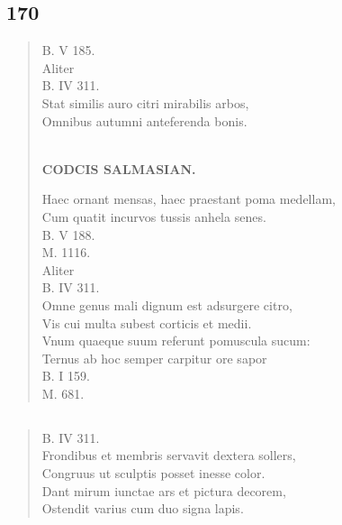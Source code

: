 \documentclass[11pt, a4paper]{report}
\begin{document}
            \subsection*{170}
      \begin{verse}
      B. V 185. \\ Aliter \\ B. IV 311. \\ Stat similis auro citri mirabilis arbos, \\ Omnibus autumni anteferenda bonis. \\ 
        ﻿\pagebreak 
    \begin{center} \textbf{CODCIS SALMASIAN.} \end{center} \marginpar{[151]} Haec ornant mensas, haec praestant poma medellam, \\ Cum quatit incurvos tussis anhela senes. \\ B. V 188. \\ M. 1116. \\ Aliter \\ B. IV 311. \\ Omne genus mali dignum est adsurgere citro, \\ Vis cui multa subest corticis et medii. \\ Vnum quaeque suum referunt pomuscula sucum: \\ Ternus ab hoc semper carpitur ore sapor \\ B. I 159. \\ M. 681. \\ 
      \end{verse}
  
            \subsection*{}
      \begin{verse}
      B. IV 311. \\ Frondibus et membris servavit dextera sollers, \\ Congruus ut sculptis posset inesse color. \\ Dant mirum iunctae ars et pictura decorem, \\ Ostendit varius cum duo signa lapis. \\ 
      \end{verse}
  
\end{document}
